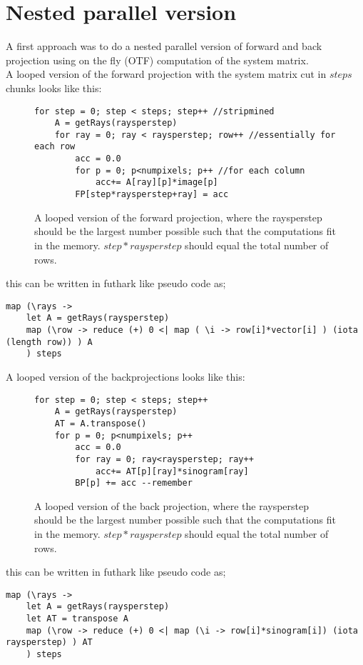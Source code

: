 \section{Nested parallel version}
A first approach was to do a nested parallel version of forward and back projection using on the fly (OTF) computation of the system matrix.\\
A looped version of the forward projection with the system matrix cut in $steps$ chunks looks like this:

\begin{figure}[h]
\begin{lstlisting}[frame=single]
for step = 0; step < steps; step++ //stripmined
	A = getRays(raysperstep)
	for ray = 0; ray < raysperstep; row++ //essentially for each row
		acc = 0.0
		for p = 0; p<numpixels; p++ //for each column
			acc+= A[ray][p]*image[p]
		FP[step*raysperstep+ray] = acc
\end{lstlisting}
  \caption{A looped version of the forward projection, where the raysperstep should be the largest number possible such that the computations fit in the memory. $step*raysperstep$ should equal the total number of rows.}
\end{figure}
this can be written in futhark like pseudo code as;
\begin{lstlisting}
map (\rays ->
	let A = getRays(raysperstep)
	map (\row -> reduce (+) 0 <| map ( \i -> row[i]*vector[i] ) (iota (length row)) ) A
	) steps
\end{lstlisting}


A looped version of the backprojections looks like this:
\begin{figure}[h]
\begin{lstlisting}[frame=single]
for step = 0; step < steps; step++
	A = getRays(raysperstep)
	AT = A.transpose()
	for p = 0; p<numpixels; p++
		acc = 0.0
		for ray = 0; ray<raysperstep; ray++
			acc+= AT[p][ray]*sinogram[ray]
		BP[p] += acc --remember
\end{lstlisting}
  \caption{A looped version of the back projection, where the raysperstep should be the largest number possible such that the computations fit in the memory. $step*raysperstep$ should equal the total number of rows.}
\end{figure}
this can be written in futhark like pseudo code as;
\begin{lstlisting}
map (\rays ->
	let A = getRays(raysperstep)
	let AT = transpose A
	map (\row -> reduce (+) 0 <| map (\i -> row[i]*sinogram[i]) (iota raysperstep) ) AT
	) steps
\end{lstlisting}


